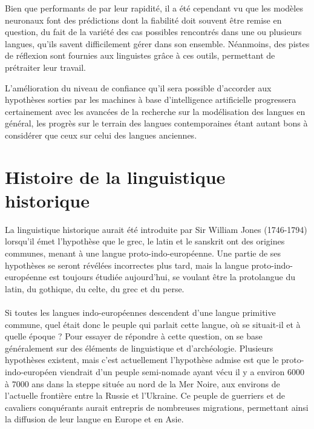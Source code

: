 \documentclass[12pt, twoside]{report}
\begin{document}
Bien que performants de par leur rapidité, il a été cependant vu que les modèles neuronaux font des prédictions dont la fiabilité doit souvent être remise en question, du fait de la variété des cas possibles rencontrés dans une ou plusieurs langues, qu'ils savent difficilement gérer dans son ensemble. Néanmoins, des pistes de réflexion sont fournies aux linguistes grâce à ces outils, permettant de prétraiter leur travail.

L'amélioration du niveau de confiance qu'il sera possible d'accorder aux hypothèses sorties par les machines à base d'intelligence artificielle progressera certainement avec les avancées de la recherche sur la modélisation des langues en général, les progrès sur le terrain des langues contemporaines étant autant bons à considérer que ceux sur celui des langues anciennes.

\printbibliography[heading=bibintoc]

\appendix

\chapter{Histoire de la linguistique historique} \label{histoire_LH}

\indent La linguistique historique aurait été introduite par Sir William Jones (1746-1794) lorsqu'il émet l'hypothèse que le grec, le latin et le sanskrit ont des origines communes, menant à une langue proto-indo-européenne. Une partie de ses hypothèses se seront révélées incorrectes plus tard, mais la langue proto-indo-européenne est toujours étudiée aujourd'hui, se voulant être la protolangue du latin, du gothique, du celte, du grec et du perse.  \\ \\ 
\indent Si toutes les langues indo-européennes descendent d'une langue primitive commune, quel était donc le peuple qui parlait cette langue, où se situait-il et à quelle époque ? Pour  essayer de répondre à cette question, on se base généralement sur des éléments de linguistique et d'archéologie. Plusieurs hypothèses existent, mais c'est actuellement l'hypothèse admise est que le proto-indo-européen viendrait d'un peuple semi-nomade ayant vécu il y a environ 6000 à 7000 ans dans la steppe située au nord de la Mer Noire, aux environs de  l'actuelle frontière entre la Russie et l'Ukraine. Ce peuple de guerriers et de cavaliers conquérants aurait entrepris de nombreuses migrations, permettant ainsi la diffusion de leur langue en Europe et en Asie.
\end{document}
